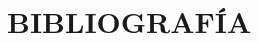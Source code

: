 \documentclass[a4paper,openright,titlepage,12pt]{article}
\numberwithin{figure}{section} 													%
\numberwithin{table}{section} 														%
\numberwithin{equation}{section}
\begin{document}





\renewcommand{\thepage}{\Roman{page}}		%
\renewcommand{\contentsname}{ÍNDICE}			%
\begin{spacing}{1.5}
	\tableofcontents
\end{spacing}
\newpage
\renewcommand{\thepage}{\arabic{page}}		%
\setcounter{page}{2}											%

\sloppy 





%

%

%

%




\renewcommand{\refname}{\thesection \ \ BIBLIOGRAFÍA}	%
\section{BIBLIOGRAFÍA}
	\nocite{*} 			%
\end{document}
